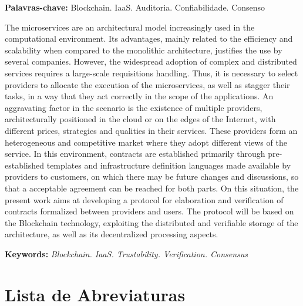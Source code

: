 \noindent \textbf{Palavras-chave:} Blockchain. IaaS. Auditoria. Confiabilidade. Consenso

 

\noindent The microservices are an architectural model increasingly used in the computational environment. Its advantages, mainly related to the efficiency and scalability when compared to the monolithic architecture, justifies the use by several companies.
%
However, the widespread adoption of complex and distributed services requires a large-scale requisitions handling.
%
Thus, it is necessary to select providers to allocate the execution of the microservices, as well as stagger their tasks, in a way that they act correctly in the scope of the applications.
%
An aggravating factor in the scenario is the existence of multiple providers, architecturally positioned in the cloud or on the edges of the Internet, with different prices, strategies and qualities in their services.
%
These providers form an heterogeneous and competitive market where they adopt different views of the service.
%
In this environment, contracts are established primarily through pre-established templates and infrastructure definition languages made available by providers to customers, on which there may be future changes and discussions, so that a acceptable agreement can be reached for both parts.
%
On this situation, the present work aims at developing a protocol for elaboration and verification of contracts formalized between providers and users.
%
The protocol will be based on the Blockchain technology, exploiting the distributed and verifiable storage of the architecture, as well as its decentralized processing aspects.

\noindent \textbf{Keywords:} \textit{Blockchain. IaaS. Trustability. Verification. Consensus}

\tableofcontents
\listoffigures
\listoftables
\newpage
\chapter*{Lista de Abreviaturas\hfill} 


\newpage
\pagestyle{myheadings}
